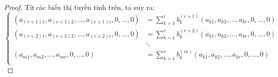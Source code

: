 \begin{proof}
    Từ các biểu thị tuyến tính trên, ta suy ra:
    \[
        \begin{cases}
            (a_{(r+1)1}, a_{(r+1)2}, \ldots, a_{(r+1)r}, 0, \ldots, 0) & = \sum^{r}_{k=1}b_{k}^{(r+1)}(a_{k1}, a_{k2}, \ldots, a_{kr}, 0, \ldots, 0) \\
            (a_{(r+2)1}, a_{(r+2)2}, \ldots, a_{(r+2)r}, 0, \ldots, 0) & = \sum^{r}_{k=1}b_{k}^{(r+2)}(a_{k1}, a_{k2}, \ldots, a_{kr}, 0, \ldots, 0) \\
                                                                       & \ddots                                                                      \\
            (a_{m1}, a_{m2}, \ldots, a_{mr}, 0, \ldots, 0)             & = \sum^{r}_{k=1}b_{k}^{(m)}(a_{k1}, a_{k2}, \ldots, a_{kr}, 0, \ldots, 0)   \\
        \end{cases}
        \tag{$\star$}
    \]
    

\end{proof}
